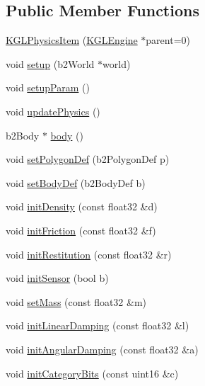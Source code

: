 \begin{CompactItemize}
\subsection*{Public Member Functions}
\begin{CompactItemize}
\item 
\hyperlink{class_k_g_l_physics_item_7930e195a22bd7e3b5809bd996cff4a4}{KGLPhysicsItem} (\hyperlink{class_k_g_l_engine}{KGLEngine} $\ast$parent=0)
\item 
void \hyperlink{class_k_g_l_physics_item_d1ec46b418f44e680e7726f2cab4aaf3}{setup} (b2World $\ast$world)
\item 
void \hyperlink{class_k_g_l_physics_item_bb70a21be98cab74c7daf10d6befbc09}{setupParam} ()
\item 
void \hyperlink{class_k_g_l_physics_item_fed8b6cdfbd684e5ed71f8af03bf9ab7}{updatePhysics} ()
\item 
b2Body $\ast$ \hyperlink{class_k_g_l_physics_item_1d2f1900e5bd95ac3699f42e8b8b9710}{body} ()
\item 
void \hyperlink{class_k_g_l_physics_item_a492016cac88405f5988d891c838c2d6}{setPolygonDef} (b2PolygonDef p)
\item 
void \hyperlink{class_k_g_l_physics_item_5596df9172f5ca0ea725419f0dce8db6}{setBodyDef} (b2BodyDef b)
\item 
void \hyperlink{class_k_g_l_physics_item_2a19b0749cfc745ad7ac0b6366185f41}{initDensity} (const float32 \&d)
\item 
void \hyperlink{class_k_g_l_physics_item_7523dc0a9453bd982a4f60d1734af46f}{initFriction} (const float32 \&f)
\item 
void \hyperlink{class_k_g_l_physics_item_6d8c120c3abedc0e6ba56905264c1d5b}{initRestitution} (const float32 \&r)
\item 
void \hyperlink{class_k_g_l_physics_item_bae743b4a3ac9f8db1b643438933a50b}{initSensor} (bool b)
\item 
void \hyperlink{class_k_g_l_physics_item_bf88ca0759ddebe73c41cdf42103f04f}{setMass} (const float32 \&m)
\item 
void \hyperlink{class_k_g_l_physics_item_8596bfa11f1267e39031d3a8b14d55e0}{initLinearDamping} (const float32 \&l)
\item 
void \hyperlink{class_k_g_l_physics_item_7041239eb6f4eaba7a921009d0fcdcf6}{initAngularDamping} (const float32 \&a)
\item 
void \hyperlink{class_k_g_l_physics_item_3b9673bad884214365837e3f87c35358}{initCategoryBits} (const uint16 \&c)
\item 

\end{CompactItemize}
\end{CompactItemize}
